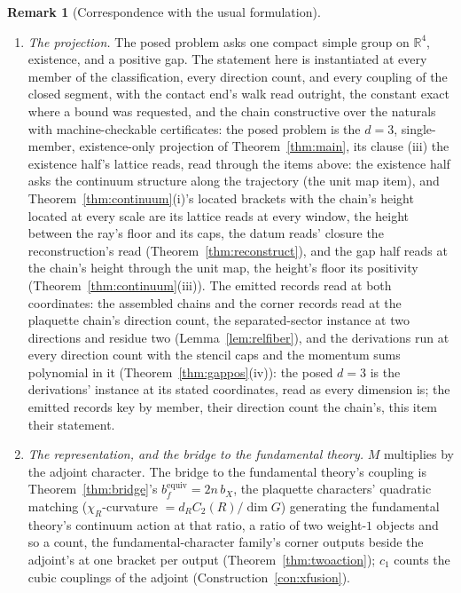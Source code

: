 \documentclass[11pt]{article}
\theoremstyle{definition}
\newtheorem{remark}{Remark}
\begin{document}
\begin{remark}[Correspondence with the usual formulation]
\begin{enumerate}[leftmargin=2em,itemsep=3pt]
\item \emph{The projection.} The posed problem asks one compact
simple group on $\mathbb R^4$, existence, and a positive gap. The
statement here is instantiated at every member of the
classification, every
direction count, and every coupling of the closed segment, with the
contact end's walk read outright, the constant exact where a bound
was requested, and the chain constructive over the naturals with
machine-checkable certificates: the posed problem is the $d=3$,
single-member, existence-only projection of Theorem~\ref{thm:main},
its clause (iii) the existence half's lattice reads,
read through the items above: the existence half asks the
continuum structure along the trajectory (the unit map item), and
Theorem~\ref{thm:continuum}(i)'s located brackets with the
chain's height located at every scale are its lattice reads at
every window, the height between the ray's floor and its caps, the
datum reads' closure the reconstruction's read
(Theorem~\ref{thm:reconstruct}), and the gap half reads at the
chain's height through the unit map, the height's floor its
positivity (Theorem~\ref{thm:continuum}(iii)). The emitted
records read at both coordinates: the assembled chains and the
corner records read at the plaquette chain's direction count, the
separated-sector instance at two directions and residue two
(Lemma~\ref{lem:relfiber}), and the derivations run at
every direction count with the stencil caps and the momentum sums
polynomial in it (Theorem~\ref{thm:gappos}(iv)): the posed $d=3$
is the derivations' instance at its stated coordinates, read as
every dimension is; the emitted records key by member, their
direction count the chain's, this item their statement.

\item \emph{The representation, and the bridge to the fundamental theory.} $M$
multiplies by the adjoint character. The bridge to the fundamental theory's coupling is
Theorem~\ref{thm:bridge}'s $b_f^{\mathrm{equiv}}=2n\,b_X$, the plaquette
characters' quadratic matching ($\chi_R$-curvature
$=d_RC_2(R)/\dim G$) generating the fundamental theory's continuum
action at that ratio, a ratio of two
weight-$1$ objects and so a count, the fundamental-character
family's corner outputs beside the adjoint's at one bracket per
output (Theorem~\ref{thm:twoaction}); $c_1$ counts the cubic couplings of the
adjoint (Construction~\ref{con:xfusion}).
\end{enumerate}
\end{remark}
\end{document}
